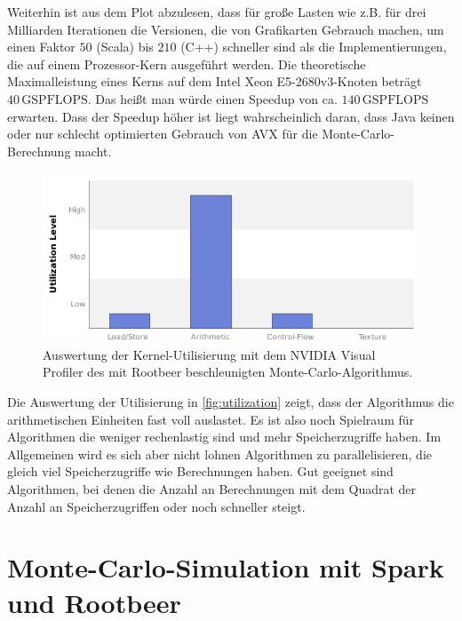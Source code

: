 Weiterhin ist aus dem Plot abzulesen, dass für große Lasten wie z.B. für drei Milliarden Iterationen die Versionen, die von Grafikarten Gebrauch machen, um einen Faktor $50$ (Scala) bis $210$ (C++) schneller sind als die Implementierungen, die auf einem Prozessor-Kern ausgeführt werden.
Die theoretische Maximalleistung eines Kerns auf dem Intel Xeon E5-2680v3-Knoten beträgt $40\,\text{GSPFLOPS}$.
Das heißt man würde einen Speedup von ca. $140\,\text{GSPFLOPS}$ erwarten.
Dass der Speedup höher ist liegt wahrscheinlich daran, dass Java keinen oder nur schlecht optimierten Gebrauch von AVX für die Monte-Carlo-Berechnung macht.

\begin{figure}[H]
	\centering
	\begin{minipage}{0.7\linewidth}
		\includegraphics[width=\linewidth]{../presentation/kernel-utilization}
	\end{minipage}
	\caption{Auswertung der Kernel-Utilisierung mit dem NVIDIA Visual Profiler des mit Rootbeer beschleunigten Monte-Carlo-Algorithmus.}
	\label{fig:utilization}
\end{figure}


Die Auswertung der Utilisierung in \autoref{fig:utilization} zeigt, dass der Algorithmus die arithmetischen Einheiten fast voll auslastet.
Es ist also noch Spielraum für Algorithmen die weniger rechenlastig sind und mehr Speicherzugriffe haben.
Im Allgemeinen wird es sich aber nicht lohnen Algorithmen zu parallelisieren, die gleich viel Speicherzugriffe wie Berechnungen haben.
Gut geeignet sind Algorithmen, bei denen die Anzahl an Berechnungen mit dem Quadrat der Anzahl an Speicherzugriffen oder noch schneller steigt.


\section{Monte-Carlo-Simulation mit Spark und Rootbeer}


